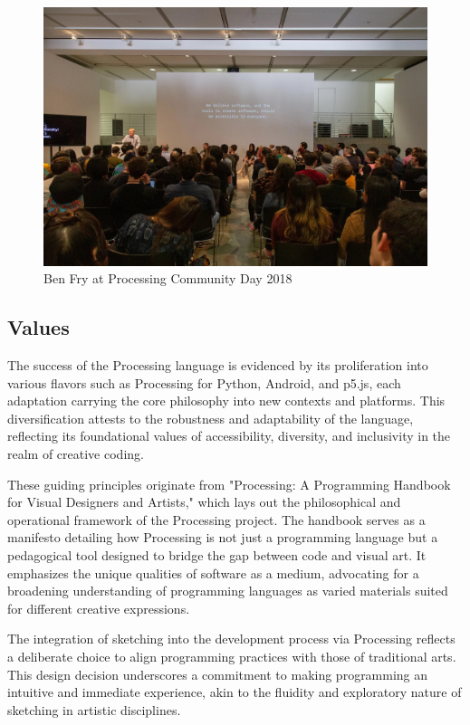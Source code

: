   \newpage 

  \begin{figure}[h]
    \centering
    \includegraphics[width=1\textwidth]{images/pcd_la_2019.jpeg}
    \caption[Ben Fry at PCD 2018]{Ben Fry at Processing Community Day 2018}
  \end{figure}
  
\subsection{Values}

The success of the Processing language is evidenced by its proliferation into various flavors such as Processing for Python, Android, and p5.js, each adaptation carrying the core philosophy into new contexts and platforms. This diversification attests to the robustness and adaptability of the language, reflecting its foundational values of accessibility, diversity, and inclusivity in the realm of creative coding.

These guiding principles originate from "Processing: A Programming Handbook for Visual Designers and Artists,"\parencite{reasProcessingProgrammingHandbook2007a} which lays out the philosophical and operational framework of the Processing project. The handbook serves as a manifesto detailing how Processing is not just a programming language but a pedagogical tool designed to bridge the gap between code and visual art. It emphasizes the unique qualities of software as a medium, advocating for a broadening understanding of programming languages as varied materials suited for different creative expressions.

The integration of sketching into the development process via Processing reflects a deliberate choice to align programming practices with those of traditional arts. This design decision underscores a commitment to making programming an intuitive and immediate experience, akin to the fluidity and exploratory nature of sketching in artistic disciplines.

